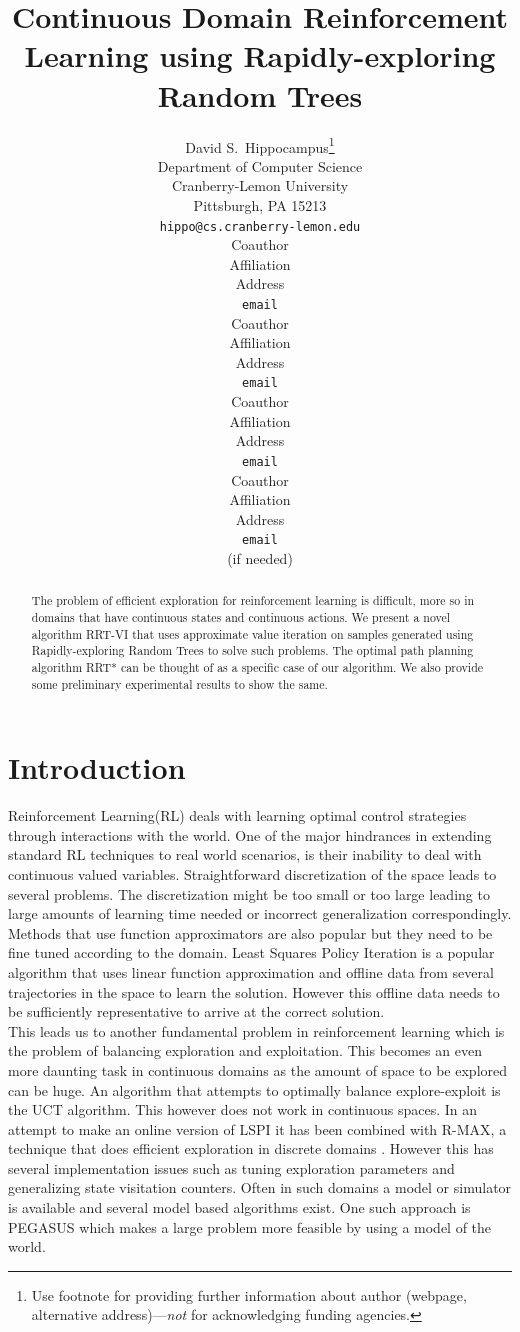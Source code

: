 \documentclass{article} %
\title{Continuous Domain Reinforcement Learning using Rapidly-exploring Random Trees}
\author{
David S.~Hippocampus\thanks{ Use footnote for providing further information
about author (webpage, alternative address)---\emph{not} for acknowledging
funding agencies.} \\
Department of Computer Science\\
Cranberry-Lemon University\\
Pittsburgh, PA 15213 \\
\texttt{hippo@cs.cranberry-lemon.edu} \\
\And
Coauthor \\
Affiliation \\
Address \\
\texttt{email} \\
\AND
Coauthor \\
Affiliation \\
Address \\
\texttt{email} \\
\And
Coauthor \\
Affiliation \\
Address \\
\texttt{email} \\
\And
Coauthor \\
Affiliation \\
Address \\
\texttt{email} \\
(if needed)\\
}
\begin{document}
\maketitle

\begin{abstract}
The problem of efficient exploration for reinforcement learning is difficult, more so in domains that have continuous states and continuous actions. We present a novel algorithm RRT-VI that uses approximate value iteration on samples generated using Rapidly-exploring Random Trees to solve such problems. The optimal path planning algorithm RRT* can be thought of as a specific case of our algorithm. We also provide some preliminary experimental results to show the same.
\end{abstract}

\section{Introduction}
Reinforcement Learning(RL) deals with learning optimal control strategies through interactions with the world. One of the major hindrances in extending standard RL techniques to real world scenarios, is their inability to deal with continuous valued variables. Straightforward discretization of the space leads to several problems. The discretization might be too small or too large leading to large amounts of learning time needed or incorrect generalization correspondingly. Methods that use function approximators are also popular but they need to be fine tuned according to the domain. Least Squares Policy Iteration \cite{lspi} is a popular algorithm that uses linear function approximation and offline data from several trajectories in the space to learn the solution. However this offline data needs to be sufficiently representative to arrive at the correct solution.\\
 This leads us to another fundamental problem in reinforcement learning which is the problem of balancing exploration and exploitation. This becomes an even more daunting task in continuous domains as the amount of space to be explored can be huge. An algorithm that attempts to optimally balance explore-exploit is the UCT algorithm\cite{uct}. This however does not work in continuous spaces. In an attempt to make an online version of LSPI it has been combined with R-MAX, a technique that does efficient exploration in discrete domains\cite{rmaxlspi} . However this has several implementation issues such as tuning exploration parameters and generalizing state visitation counters. Often in such domains a model or simulator is available and several model based algorithms exist. One such approach is PEGASUS \cite{pegasus} which makes a large problem more feasible by using a model of the world.\\
\end{document}
